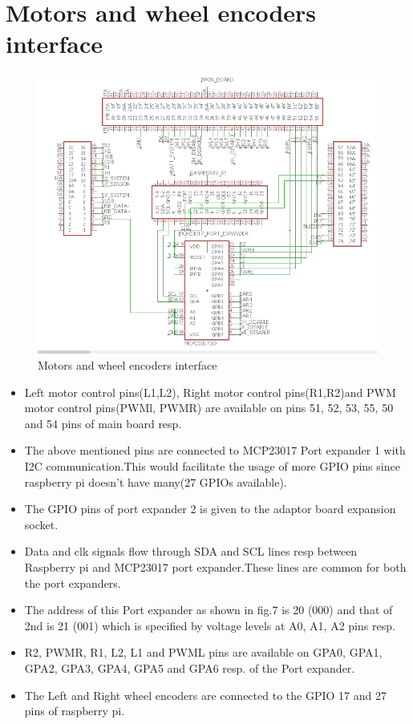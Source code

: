 \documentclass[a4paper,12pt,oneside]{book}
\begin{document}
\section{\textbf{Motors and wheel encoders interface}}
\begin{figure}[h]
	\includegraphics[width=1\textwidth]{wheels}
	\caption{Motors and wheel encoders interface}
\end{figure}
\hfill
\begin{itemize}
	\item {Left motor control pins(L1,L2), Right motor control pins(R1,R2)and PWM motor control pins(PWMl, PWMR) are available on pins 51, 52, 53, 55, 50 and 54 pins of main board resp.}
	\item {The above mentioned pins are connected to MCP23017 Port expander 1 with I2C communication.This would facilitate the usage of more GPIO pins since raspberry pi doesn't have many(27 GPIOs available).}
	\item {The GPIO pins of port expander 2 is given to the adaptor board expansion socket.}
	\item {Data and clk signals flow through SDA and SCL lines resp between Raspberry pi and MCP23017 port expander.These lines are common for both the port expanders.}
	\item {The address of this Port expander as shown in fig.7 is 20 (000) and that of 2nd is 21 (001) which is specified by voltage levels at A0, A1, A2 pins resp.}
	\item {R2, PWMR, R1, L2, L1 and PWML pins are available on GPA0, GPA1, GPA2, GPA3, GPA4, GPA5 and GPA6 resp. of the Port expander.}
   	\item {The Left and Right wheel encoders are connected to the GPIO 17 and 27 pins of raspberry pi.}
\end{itemize}
\pagebreak
\end{document}
